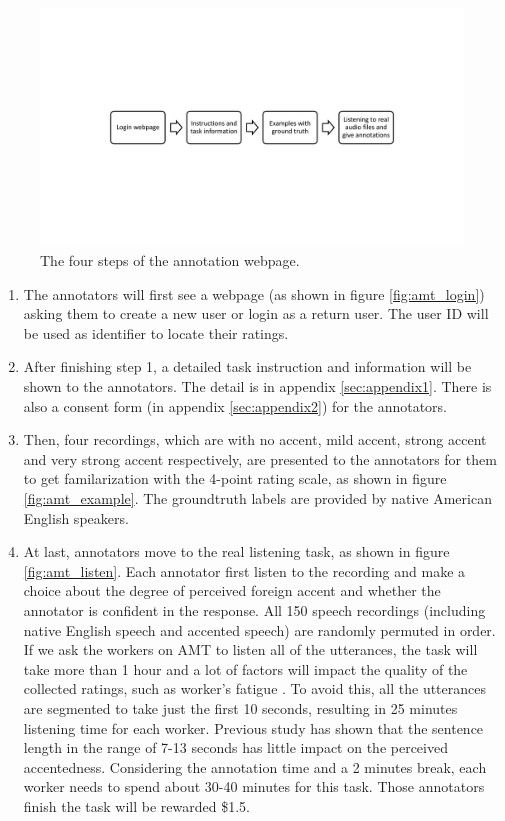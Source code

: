 \begin{figure}[t]
\centering
\captionsetup{justification=centering}
\includegraphics[width = 1.0\linewidth]{figures/amt_procedure.pdf}
\caption{The four steps of the annotation webpage.}
\label{fig:amt_procedure}
\end{figure}

\begin{enumerate}
\item The annotators will first see a webpage (as shown in figure \ref{fig:amt_login}) asking them to create a new user or login as a return user. The user ID will be used as identifier to locate their ratings.
\item After finishing step 1, a detailed task instruction and information will be shown to the annotators. The detail is in appendix \ref{sec:appendix1}. There is also a consent form (in appendix \ref{sec:appendix2}) for the annotators.
\item Then, four recordings, which are with no accent, mild accent, strong accent and very strong accent respectively, are presented to the annotators for them to get familarization with the 4-point rating scale, as shown in figure \ref{fig:amt_example}. The groundtruth labels are provided by native American English speakers.
\item At last, annotators move to the real listening task, as shown in figure \ref{fig:amt_listen}. Each annotator first listen to the recording and make a choice about the degree of perceived foreign accent and whether the annotator is confident in the response. All 150 speech recordings (including native English speech and accented speech) are randomly permuted in order. If we ask the workers on AMT to listen all of the utterances, the task will take more than 1 hour and a lot of factors will impact the quality of the collected ratings, such as worker's fatigue \citep{rzeszotarski2013inserting}. To avoid this, all the utterances are segmented to take just the first 10 seconds, resulting in 25 minutes listening time for each worker. Previous study \citep{munro1995foreign} has shown that the sentence length in the range of 7-13 seconds has little impact on the perceived accentedness. Considering the annotation time and a 2 minutes break, each worker needs to spend about 30-40 minutes for this task. Those annotators finish the task will be rewarded \$1.5.
\end{enumerate}


